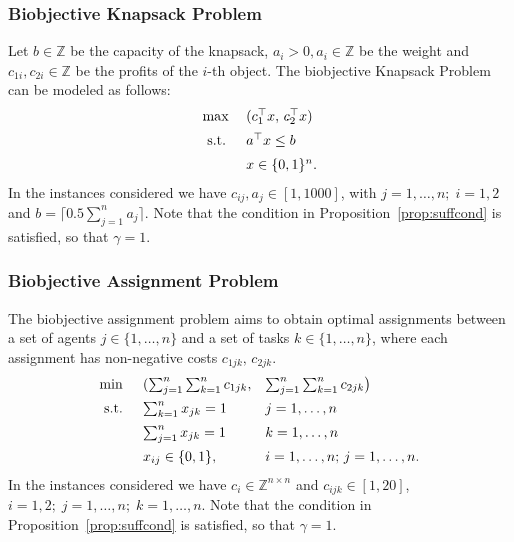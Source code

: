 \documentclass[preprint,12pt]{elsarticle}
\def\Z{\mathbb{Z}}
\begin{document}
\subsubsection{Biobjective Knapsack Problem}\label{sec:num-kp}
Let $b\in \Z$ be the capacity of the knapsack, $a_i > 0, a_i\in \Z$ be the weight
and $c_{1i}, c_{2i}\in \Z$ be the profits of the
$i$-th object.
The biobjective Knapsack Problem can be modeled as follows:
\begin{equation*}\label{BOIKP}
\begin{array}{l l}
    \max & (c_{1}^\top x,\, c_2^\top x)\\[1.2ex]
    \textnormal{ s.t. }&  a^\top x \leq b\\[1.2ex]
    & x\in\{0,1\}^n.
  \end{array}
 \end{equation*}
In the instances considered we have $c_{ij}, a_j\in[1,1000]$, with $j=1,\ldots,n; \; i=1,2$ and $b = \big\lceil 0.5 \sum_{j=1}^n a_j \big\rceil$.
Note that the condition in Proposition~\ref{prop:suffcond} is satisfied, so that $\gamma=1$.

\subsubsection{Biobjective Assignment Problem}\label{sec:num-ap}
The biobjective assignment problem aims to obtain optimal
assignments between a set of agents $j\in \{1,\ldots, n\}$ and a set of tasks $k\in \{1,\ldots, n\}$, where each assignment
has non-negative costs $c_{1jk},\, c_{2jk}$.
\begin{equation*}\label{BOIAP}
\begin{array}{l l l}
    \min & (\sum_{j=1}^n\sum_{k=1}^n c_{1jk},& \sum_{j=1}^n\sum_{k=1}^n c_{2jk}\big)\\[1.2ex]
    \textnormal{ s.t. }&  \sum_{k=1}^n x_{jk} = 1 & j=1,\ldots,n\\[1.2ex]
    &  \sum_{j=1}^n x_{jk} = 1 & k=1,\ldots,n\\[1.2ex]
    & x_{ij}\in\{0,1\}, & i=1,\ldots,n;\, j=1,\ldots,n.
  \end{array}
 \end{equation*}
In the instances considered we have $c_i\in \Z^{n\times n}$ and $c_{ijk}\in [1,20]$,\, $i=1,2;\; j=1,\ldots,n;\; k=1,\ldots,n$.
Note that the condition in Proposition~\ref{prop:suffcond} is satisfied, so that $\gamma=1$.
\end{document}
